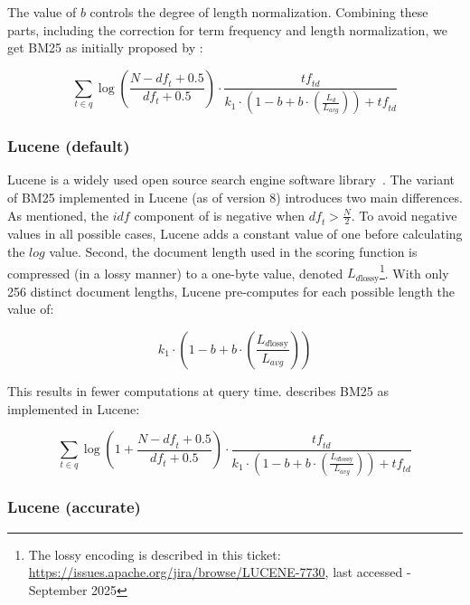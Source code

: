 The value of $b$ controls the degree of length normalization. Combining these parts, including the correction for term frequency and length normalization, we get BM25 as initially proposed by \citet{bm25-robertson}:

\begin{equation}
	\label{bm25-robertson}
	\sum_{t\in q} \log\left(\frac{N-\mathit{df}_t+0.5}{df_t+0.5}\right)\cdot\frac{\mathit{tf}_{\mathit{td}}}{k_1\cdot\left(1-b+b\cdot\left(\frac{L_d}{L_{\mathit{avg}}}\right)\right) + \mathit{tf}_{\mathit{td}}}
\end{equation}

\subsubsection{Lucene (default)}
Lucene is a widely used open source search engine software library~\citep{lucene}. 
The variant of BM25 implemented in Lucene (as of version 8) introduces two main differences. As mentioned, the $\mathit{idf}$ component of \citet{bm25-robertson} is negative when $\mathit{df}_t > \frac{N}{2}$.
To avoid negative values in all possible cases, Lucene adds a constant value of one before calculating the $log$ value. 
Second, the document length used in the scoring function is compressed (in a lossy manner) to a one-byte value, denoted $L_{d\text{lossy}}$\footnote{The lossy encoding is described in this ticket: \url{https://issues.apache.org/jira/browse/LUCENE-7730}, last accessed - September 2025}. With only 256 distinct document lengths, Lucene pre-computes for each possible length the value of:

\begin{equation}
	k_1 \cdot \left(1-b+b\cdot\left(\frac{L_{d\text{lossy}}}{L_{\mathit{avg}}}\right)\right)
\end{equation}

This results in fewer computations at query time.  describes BM25 as implemented in Lucene:

\begin{equation}
	\label{lucene-default}
	\sum_{t\in q}\log\left(1 + \frac{N-\mathit{df}_t+0.5}{\mathit{df}_t+0.5}\right)\cdot\frac{\mathit{tf}_{\mathit{td}}}{k_1\cdot\left(1-b+b\cdot\left(\frac{L_{d \text{lossy}}}{L_{\mathit{avg}}}\right)\right)+\mathit{tf}_{\mathit{td}}}
\end{equation}

\subsubsection{Lucene (accurate)}

